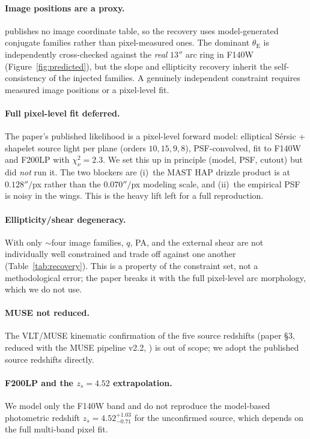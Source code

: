 \documentclass[11pt,letterpaper]{article}
\newcommand{\thetaE}{\ensuremath{\theta_{\mathrm{E}}}}
\newcommand{\zs}{\ensuremath{z_s}}
\begin{document}
\paragraph{Image positions are a proxy.} \citet{sheu2024carousel} publishes no
image coordinate table, so the recovery uses model-generated conjugate
families rather than pixel-measured ones. The dominant $\thetaE$ is
independently cross-checked against the \emph{real} $13''$ arc ring in F140W
(Figure~\ref{fig:predicted}), but the slope and ellipticity recovery inherit
the self-consistency of the injected families. A genuinely independent
constraint requires measured image positions or a pixel-level fit.

\paragraph{Full pixel-level fit deferred.} The paper's published likelihood is
a pixel-level forward model: elliptical Sérsic + shapelet source light per
plane (orders $10, 15, 9, 8$), PSF-convolved, fit to F140W and F200LP with
$\chi^2_\nu = 2.3$. We set this up in principle (model, PSF, cutout) but did
\emph{not} run it. The two blockers are (i)~the MAST HAP drizzle product is at
$0.128''/$px rather than the $0.070''/$px modeling scale, and (ii)~the
empirical PSF is noisy in the wings. This is the heavy lift left for a full
reproduction.

\paragraph{Ellipticity/shear degeneracy.} With only $\sim$four image families,
$q$, PA, and the external shear are not individually well constrained and
trade off against one another (Table~\ref{tab:recovery}). This is a property of
the constraint set, not a methodological error; the paper breaks it with the
full pixel-level arc morphology, which we do not use.

\paragraph{MUSE not reduced.} The VLT/MUSE kinematic confirmation of the five
source redshifts (paper \S3, reduced with the MUSE pipeline v2.2,
\citealt{weilbacher2020musepipe}) is out of scope; we adopt the published
source redshifts directly.

\paragraph{F200LP and the $z_s = 4.52$ extrapolation.} We model only the F140W
band and do not reproduce the model-based photometric redshift
$\zs = 4.52^{+1.03}_{-0.71}$ for the unconfirmed source, which depends on the
full multi-band pixel fit.
\end{document}
